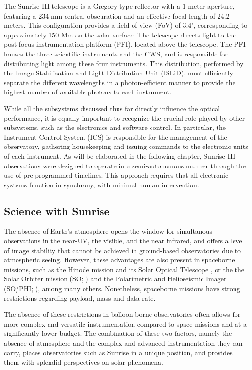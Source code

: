 The Sunrise III telescope is a Gregory-type reflector with a 1-meter aperture, featuring a 234 mm central obscuration and an effective focal length of 24.2 meters. This configuration provides a field of view (FoV) of 3.4', corresponding to approximately 150 Mm on the solar surface. The telescope directs light to the post-focus instrumentation platform (PFI), located above the telescope. The PFI houses the three scientific instruments and the CWS, and is responsible for distributing light among these four instruments. This distribution, performed by the Image Stabilization and Light Distribution Unit (ISLiD), must efficiently separate the different wavelengths in a photon-efficient manner to provide the highest number of available photons to each instrument. 

While all the subsystems discussed thus far directly influence the optical performance, it is equally important to recognize the crucial role played by other subsystems, such as the electronics and software control. In particular, the Instrument Control System (ICS) is responsible for the management of the observatory, gathering housekeeping and issuing commands to the electronic units of each instrument. As will be elaborated in the following chapter, Sunrise III observations were designed to operate in a semi-autonomous manner through the use of pre-programmed timelines. This approach requires that all electronic systems function in synchrony, with minimal human intervention. 

\subsection{Science with Sunrise}

The absence of Earth's atmosphere opens the window for simultanous observations in the near-UV, the visible, and the near infrared, and offers a level of image stability that cannot be achieved in ground-based observatories due to atmospheric seeing. However, these advantages are also present in spaceborne missions, such as the Hinode mission \citep{Hinode} and its Solar Optical Telescope \citep{sot}, or the the Solar Orbiter mission (SO; \citealt{SO}) and the Polarimetric and Helioseismic Imager (SO/PHI; \citealt{PHI}), among many others. Nonetheless, spaceborne missions have strong restrictions regarding payload, mass and data rate. 

The absence of these restrictions in balloon-borne observatories often allows for more complex and versatile instrumentation compared to space missions and at a significantly lower budget. The combination of these two factors, namely the absence of atmosphere and the complex and advanced instrumentation they can carry, places observatories such as Sunrise in a unique position, and provides them with splendid perspectives on solar phenomena.

